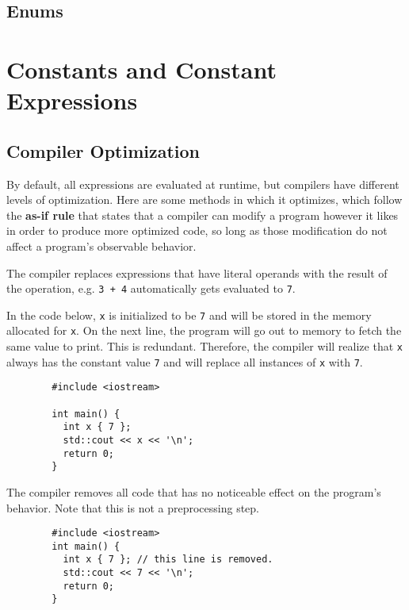 \documentclass{article}
\begin{document}
  \subsection{Enums}  

\section{Constants and Constant Expressions}

  \subsection{Compiler Optimization} 

    By default, all expressions are evaluated at runtime, but compilers have different levels of optimization. Here are some methods in which it optimizes, which follow the \textbf{as-if rule} that states that a compiler can modify a program however it likes in order to produce more optimized code, so long as those modification do not affect a program's observable behavior. 

    \begin{definition} 
      The compiler replaces expressions that have literal operands with the result of the operation, e.g. \texttt{3 + 4} automatically gets evaluated to \texttt{7}. 
    \end{definition}

    \begin{definition}
      In the code below, \texttt{x} is initialized to be \texttt{7} and will be stored in the memory allocated for \texttt{x}. On the next line, the program will go out to memory to fetch the same value to print. This is redundant. Therefore, the compiler will realize that \texttt{x} always has the constant value \texttt{7} and will replace all instances of \texttt{x} with \texttt{7}. 
      \begin{lstlisting}
        #include <iostream>

        int main() {
          int x { 7 };
          std::cout << x << '\n';
          return 0;
        } 
      \end{lstlisting}
    \end{definition}

    \begin{definition}
      The compiler removes all code that has no noticeable effect on the program's behavior. Note that this is not a preprocessing step. 
      \begin{lstlisting}
        #include <iostream>
        int main() {
          int x { 7 }; // this line is removed. 
          std::cout << 7 << '\n';
          return 0;
        } 
      \end{lstlisting}
    \end{definition} 
\end{document}
